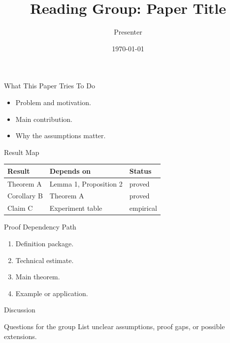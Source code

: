 \documentclass[10pt,aspectratio=169]{beamer}
\title{Reading Group: Paper Title}
\author{Presenter}
\date{\today}
\begin{document}
\begin{frame}\titlepage\end{frame}

\begin{frame}{What This Paper Tries To Do}
  \begin{itemize}
    \item Problem and motivation.
    \item Main contribution.
    \item Why the assumptions matter.
  \end{itemize}
\end{frame}

\begin{frame}{Result Map}
  \begin{tabular}{lll}
    \toprule
    Result & Depends on & Status \\
    \midrule
    Theorem A & Lemma 1, Proposition 2 & proved \\
    Corollary B & Theorem A & proved \\
    Claim C & Experiment table & empirical \\
    \bottomrule
  \end{tabular}
\end{frame}

\begin{frame}{Proof Dependency Path}
  \begin{enumerate}
    \item Definition package.
    \item Technical estimate.
    \item Main theorem.
    \item Example or application.
  \end{enumerate}
\end{frame}

\begin{frame}{Discussion}
  \begin{block}{Questions for the group}
    List unclear assumptions, proof gaps, or possible extensions.
  \end{block}
\end{frame}
\end{document}
